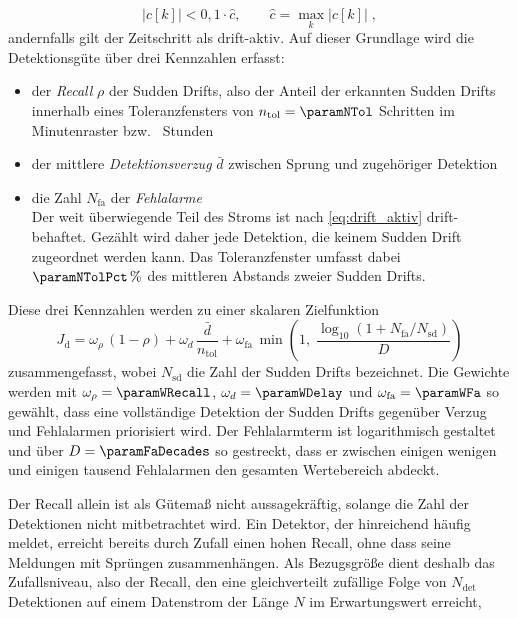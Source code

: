 %
\begin{equation}
    |c[k]| < 0{,}1 \cdot \hat{c}, \qquad \hat{c} = \max_k |c[k]| \; ,
    \label{eq:drift_aktiv}
\end{equation}
%
andernfalls gilt der Zeitschritt als drift-aktiv. Auf dieser Grundlage wird die Detektionsgüte über drei Kennzahlen erfasst: 
%
\begin{itemize}
    \item der \emph{Recall} $\rho$ der Sudden Drifts, also der Anteil der erkannten Sudden Drifts innerhalb eines Toleranzfensters von $n_{\mathrm{tol}} = \paramNTol$ Schritten im Minutenraster bzw.\ \paramNTolH{} Stunden
    \item der mittlere \emph{Detektionsverzug} $\bar{d}$ zwischen Sprung und zugehöriger Detektion
    \item die Zahl $N_{\mathrm{fa}}$ der \emph{Fehlalarme} \\
    Der weit überwiegende Teil des Stroms ist nach \eqref{eq:drift_aktiv} drift-behaftet. Gezählt wird daher jede Detektion, die keinem Sudden Drift zugeordnet werden kann. Das Toleranzfenster umfasst dabei $\paramNTolPct\,\%$ des mittleren Abstands zweier Sudden Drifts.
\end{itemize}
%
Diese drei Kennzahlen werden zu einer skalaren Zielfunktion
%
\begin{equation}
    J_{\mathrm{d}} = \omega_{\rho} \, (1 - \rho)
    + \omega_{d} \, \frac{\bar{d}}{n_{\mathrm{tol}}}
    + \omega_{\mathrm{fa}} \, \min\!\left(1, \;
      \frac{\log_{10}\!\left(1 + N_{\mathrm{fa}} / N_{\mathrm{sd}}\right)}{D}\right)
    \label{eq:detektion_score}
\end{equation}
%
zusammengefasst, wobei $N_{\mathrm{sd}}$ die Zahl der Sudden Drifts bezeichnet. Die Gewichte werden mit $\omega_{\rho} = \paramWRecall$, $\omega_{d} = \paramWDelay$ und $\omega_{\mathrm{fa}} = \paramWFa$ so gewählt, dass eine vollständige Detektion der Sudden Drifts gegenüber Verzug und Fehlalarmen priorisiert wird. Der Fehlalarmterm ist logarithmisch gestaltet und über $D = \paramFaDecades$ so gestreckt, dass er zwischen einigen wenigen und einigen tausend Fehlalarmen den gesamten Wertebereich abdeckt. \par
%
Der Recall allein ist als Gütemaß nicht aussagekräftig, solange die Zahl der Detektionen nicht mitbetrachtet wird. Ein Detektor, der hinreichend häufig meldet, erreicht bereits durch Zufall einen hohen Recall, ohne dass seine Meldungen mit Sprüngen zusammenhängen. Als Bezugsgröße dient deshalb das Zufallsniveau, also der Recall, den eine gleichverteilt zufällige Folge von $N_{\mathrm{det}}$ Detektionen auf einem Datenstrom der Länge $N$ im Erwartungswert erreicht,
